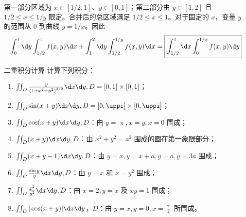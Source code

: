 \begin{solution}
\begin{center}
    \end{center}

    第一部分区域为 $x \in [1/2, 1]$、$y \in [0, 1]$；第二部分由 $y \in [1, 2]$ 且 $1/2 \le x \le 1/y$ 限定。合并后的总区域满足 $1/2 \le x \le 1$。对于固定的 $x$，变量 $y$ 的范围从 $0$ 到曲线 $y = 1/x$。因此
    \begin{equation}
        \int_{0}^{1} \d y \int_{1/2}^{1} f(x, y) \d x + \int_{1}^{2} \d y \int_{1/2}^{1/y} f(x, y) \d x = \boxed{\int_{1/2}^{1} \d x \int_{0}^{1/x} f(x, y) \d y}
    \end{equation}
\end{solution}


\begin{problem}{二重积分计算}{}
    计算下列积分：
    \begin{enumerate}
        \item $\iint_{D} \frac{y}{\left(1+x^{2}+y^{2}\right)^{3 / 2}} \d x \d y, D=[0,1] \times [0,1]$；
        \item $\iint_{D} \sin (x+y) \d x \d y, D=[0, \uppi] \times [0,\uppi]$；
        \item $\iint_{D} \cos (x+y) \d x \d y, D$：由 $y=\uppi, x=y, x=0$ 围成；
        \item $\iint_{D}(x+y) \d x \d y, D$：由 $x^{2}+y^{2}=a^{2}$ 围成的圆在第一象限部分；
        \item $\iint_{D}(x+y-1) \d x \d y, D$：由 $y=x, y=x+a, y=a, y=3 a$ 围成；
        \item $\iint_{D} \frac{\sin y}{y} \d x \d y, D$：由 $y=x$ 和 $x=y^{2}$ 围成；
        \item $\iint_{D} \frac{x^{2}}{y^{2}} \d x \d y, D$：由 $x=2, y=x$ 及 $x y=1$ 围成；
        \item $\iint_{D}|\cos (x+y)| \d x \d y$，$D$：由 $y=x, y=0, x=\frac{\uppi}{2}$ 所围成。
    \end{enumerate}
\end{problem}

